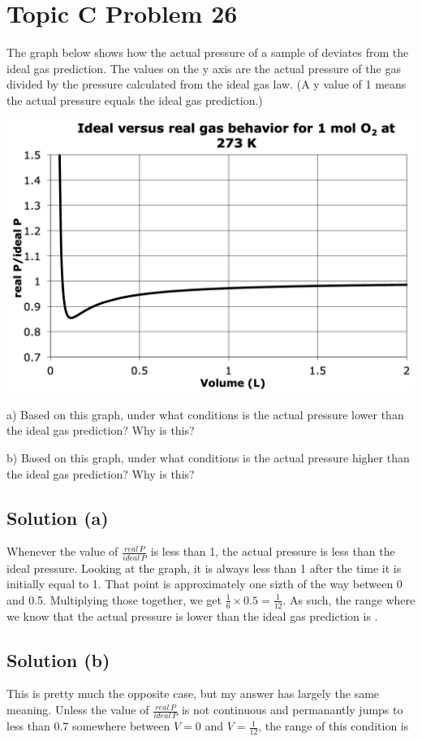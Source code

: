 \documentclass[10pt]{article}
\begin{document}
    \pagebreak
    \section{Topic C Problem 26}
        The graph below shows how the actual pressure of a sample of  deviates from the ideal gas prediction. 
        The values on the y axis are the actual pressure of the gas divided by the pressure calculated from the ideal gas law. 
        (A y value of 1 means the actual pressure equals the ideal gas prediction.)
        \begin{center}
            \includegraphics[width=\textwidth]{picture_C-26.png}
        \end{center}

        a) Based on this graph, under what conditions is the actual pressure lower than the ideal gas prediction? 
        Why is this?
        
        b) Based on this graph, under what conditions is the actual pressure higher than the ideal gas prediction? 
        Why is this?

        \subsection{Solution (a)}
            Whenever the value of $\frac{real\,P}{ideal\,P}$ is less than 1, the actual pressure is less than the ideal pressure.
            Looking at the graph, it is always less than 1 after the time it is initially equal to 1. 
            That point is approximately one sizth of the way between 0 and 0.5. 
            Multiplying those together, we get $\frac{1}{6} \times 0.5 = \frac{1}{12}$. 
            As such, the range where we know that the actual pressure is lower than the ideal gas prediction is \boxed{\left(\frac{1}{12},2\right]}. 

        \subsection{Solution (b)}
            This is pretty much the opposite case, but my answer has largely the same meaning. 
            Unless the value of $\frac{real\,P}{ideal\,P}$ is not continuous and permanantly jumps to less than 0.7 somewhere between $V = 0$ and $V = \frac{1}{12}$, the range of this condition is \boxed{\left[0, \frac{1}{12}\right)}

    \pagebreak

    \tableofcontents
\end{document}
